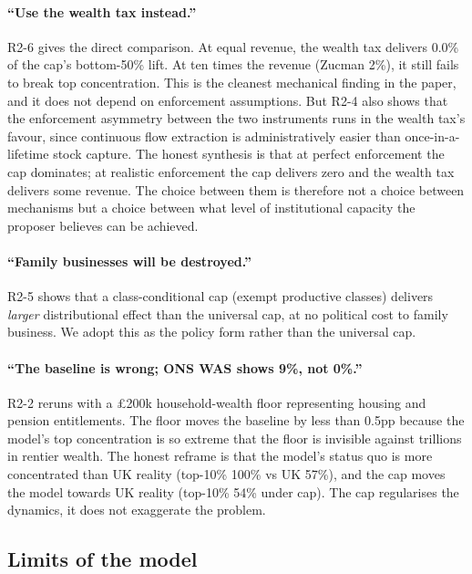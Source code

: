 \documentclass[11pt]{article}
\begin{document}
\paragraph{``Use the wealth tax instead.''}  R2-6 gives the direct
comparison.  At equal revenue, the wealth tax delivers 0.0\% of the
cap's bottom-50\% lift.  At ten times the revenue (Zucman 2\%), it
still fails to break top concentration.  This is the cleanest
mechanical finding in the paper, and it does not depend on
enforcement assumptions.  But R2-4 also shows that the enforcement
asymmetry between the two instruments runs in the wealth tax's
favour, since continuous flow extraction is administratively
easier than once-in-a-lifetime stock capture.  The honest
synthesis is that at perfect enforcement the cap dominates; at
realistic enforcement the cap delivers zero and the wealth tax
delivers some revenue.  The choice between them is therefore not
a choice between mechanisms but a choice between what level of
institutional capacity the proposer believes can be achieved.

\paragraph{``Family businesses will be destroyed.''}  R2-5 shows
that a class-conditional cap (exempt productive classes) delivers
\emph{larger} distributional effect than the universal cap, at no
political cost to family business.  We adopt this as the policy
form rather than the universal cap.

\paragraph{``The baseline is wrong; ONS WAS shows 9\%, not 0\%.''}
R2-2 reruns with a \pounds 200k household-wealth floor representing
housing and pension entitlements.  The floor moves the baseline by
less than 0.5pp because the model's top concentration is so
extreme that the floor is invisible against trillions in rentier
wealth.  The honest reframe is that the model's status quo is more
concentrated than UK reality (top-10\% 100\% vs UK 57\%), and the
cap moves the model towards UK reality (top-10\% 54\% under cap).
The cap regularises the dynamics, it does not exaggerate the
problem.

\subsection{Limits of the model}
\label{sec:limits}
\end{document}
